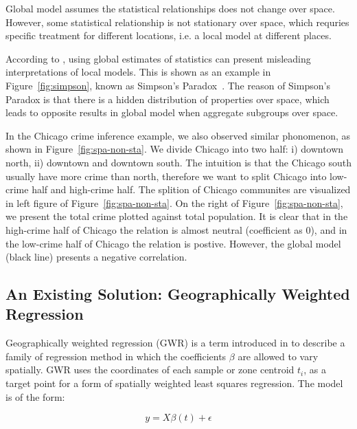 Global model assumes the statistical relationships does not change over space. However, some statistical relationship is not stationary over space, which requries specific treatment for different locations, i.e. a local model at different places.



According to \cite{GWR03}, using global estimates of statistics can present misleading interpretations of local models. This is shown as an example in Figure~\ref{fig:simpson}, known as Simpson's Paradox~\cite{wiki:simpson}. The reason of Simpson's Paradox is that there is a hidden distribution of properties over space, which leads to opposite results in global model when aggregate subgroups over space.





In the Chicago crime inference example, we also observed similar phonomenon, as shown in Figure~\ref{fig:spa-non-sta}. We divide Chicago into two half: i) downtown north, ii) downtown and downtown south. The intuition is that the Chicago south usually have more crime than north, therefore we want to split Chicago into low-crime half and high-crime half. The splition of Chicago communites are visualized in left figure of Figure~\ref{fig:spa-non-sta}. 
On the right of Figure~\ref{fig:spa-non-sta}, we present the total crime plotted against total population. It is clear that in the high-crime half of Chicago the relation is almost neutral (coefficient as 0), and in the low-crime half of Chicago the relation is postive. However, the global model (black line) presents a negative correlation.





\subsection{An Existing Solution: Geographically Weighted Regression}


Geographically weighted regression (GWR) is a term introduced in \cite{GWR03} to describe a family of regression method in which the coefficients $\beta$ are allowed to vary spatially. GWR uses the coordinates of each sample or zone centroid $t_i$, as a target point for a form of spatially weighted least squares regression. The model is of the form:

\begin{equation}
y = X \beta(t) + \epsilon
\end{equation}

